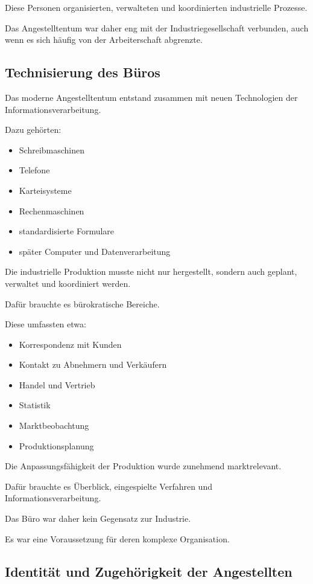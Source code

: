 Diese Personen organisierten,
verwalteten
und koordinierten industrielle Prozesse.

Das Angestelltentum war daher
eng mit der Industriegesellschaft verbunden,
auch wenn es sich häufig
von der Arbeiterschaft abgrenzte.

\subsection{Technisierung des Büros}

Das moderne Angestelltentum entstand
zusammen mit neuen Technologien
der Informationsverarbeitung.

Dazu gehörten:

\begin{itemize}
\item Schreibmaschinen
\item Telefone
\item Karteisysteme
\item Rechenmaschinen
\item standardisierte Formulare
\item später Computer und Datenverarbeitung
\end{itemize}

Die industrielle Produktion
musste nicht nur hergestellt,
sondern auch geplant,
verwaltet
und koordiniert werden.

Dafür brauchte es bürokratische Bereiche.

Diese umfassten etwa:

\begin{itemize}
\item Korrespondenz mit Kunden
\item Kontakt zu Abnehmern und Verkäufern
\item Handel und Vertrieb
\item Statistik
\item Marktbeobachtung
\item Produktionsplanung
\end{itemize}

Die Anpassungsfähigkeit der Produktion
wurde zunehmend marktrelevant.

Dafür brauchte es Überblick,
eingespielte Verfahren
und Informationsverarbeitung.

Das Büro war daher kein Gegensatz
zur Industrie.

Es war eine Voraussetzung
für deren komplexe Organisation.

\subsection{Identität und Zugehörigkeit der Angestellten}

